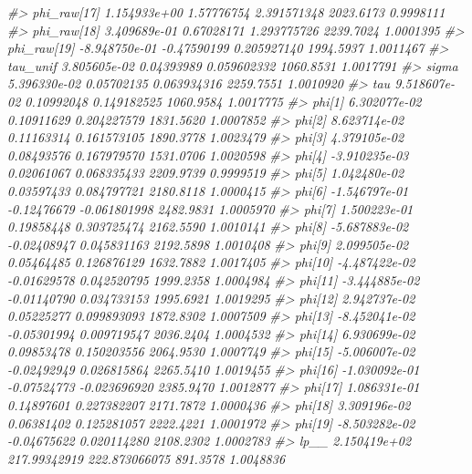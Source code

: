 \documentclass[
]{article}
\newenvironment{Shaded}{\begin{snugshade}}{\end{snugshade}}
\newcommand{\CommentTok}[1]{\textcolor[rgb]{0.56,0.35,0.01}{\textit{#1}}}
\begin{document}
\begin{Shaded}
\begin{Highlighting}[]
\CommentTok{\#\textgreater{} phi\_raw[17]  1.154933e+00   1.57776754   2.391571348 2023.6173 0.9998111}
\CommentTok{\#\textgreater{} phi\_raw[18]  3.409689e{-}01   0.67028171   1.293775726 2239.7024 1.0001395}
\CommentTok{\#\textgreater{} phi\_raw[19] {-}8.948750e{-}01  {-}0.47590199   0.205927140 1994.5937 1.0011467}
\CommentTok{\#\textgreater{} tau\_unif     3.805605e{-}02   0.04393989   0.059602332 1060.8531 1.0017791}
\CommentTok{\#\textgreater{} sigma        5.396330e{-}02   0.05702135   0.063934316 2259.7551 1.0010920}
\CommentTok{\#\textgreater{} tau          9.518607e{-}02   0.10992048   0.149182525 1060.9584 1.0017775}
\CommentTok{\#\textgreater{} phi[1]       6.302077e{-}02   0.10911629   0.204227579 1831.5620 1.0007852}
\CommentTok{\#\textgreater{} phi[2]       8.623714e{-}02   0.11163314   0.161573105 1890.3778 1.0023479}
\CommentTok{\#\textgreater{} phi[3]       4.379105e{-}02   0.08493576   0.167979570 1531.0706 1.0020598}
\CommentTok{\#\textgreater{} phi[4]      {-}3.910235e{-}03   0.02061067   0.068335433 2209.9739 0.9999519}
\CommentTok{\#\textgreater{} phi[5]       1.042480e{-}02   0.03597433   0.084797721 2180.8118 1.0000415}
\CommentTok{\#\textgreater{} phi[6]      {-}1.546797e{-}01  {-}0.12476679  {-}0.061801998 2482.9831 1.0005970}
\CommentTok{\#\textgreater{} phi[7]       1.500223e{-}01   0.19858448   0.303725474 2162.5590 1.0010141}
\CommentTok{\#\textgreater{} phi[8]      {-}5.687883e{-}02  {-}0.02408947   0.045831163 2192.5898 1.0010408}
\CommentTok{\#\textgreater{} phi[9]       2.099505e{-}02   0.05464485   0.126876129 1632.7882 1.0017405}
\CommentTok{\#\textgreater{} phi[10]     {-}4.487422e{-}02  {-}0.01629578   0.042520795 1999.2358 1.0004984}
\CommentTok{\#\textgreater{} phi[11]     {-}3.444885e{-}02  {-}0.01140790   0.034733153 1995.6921 1.0019295}
\CommentTok{\#\textgreater{} phi[12]      2.942737e{-}02   0.05225277   0.099893093 1872.8302 1.0007509}
\CommentTok{\#\textgreater{} phi[13]     {-}8.452041e{-}02  {-}0.05301994   0.009719547 2036.2404 1.0004532}
\CommentTok{\#\textgreater{} phi[14]      6.930699e{-}02   0.09853478   0.150203556 2064.9530 1.0007749}
\CommentTok{\#\textgreater{} phi[15]     {-}5.006007e{-}02  {-}0.02492949   0.026815864 2265.5410 1.0019455}
\CommentTok{\#\textgreater{} phi[16]     {-}1.030092e{-}01  {-}0.07524773  {-}0.023696920 2385.9470 1.0012877}
\CommentTok{\#\textgreater{} phi[17]      1.086331e{-}01   0.14897601   0.227382207 2171.7872 1.0000436}
\CommentTok{\#\textgreater{} phi[18]      3.309196e{-}02   0.06381402   0.125281057 2222.4221 1.0001972}
\CommentTok{\#\textgreater{} phi[19]     {-}8.503282e{-}02  {-}0.04675622   0.020114280 2108.2302 1.0002783}
\CommentTok{\#\textgreater{} lp\_\_         2.150419e+02 217.99342919 222.873066075  891.3578 1.0048836}
\end{Highlighting}
\end{Shaded}
\end{document}
